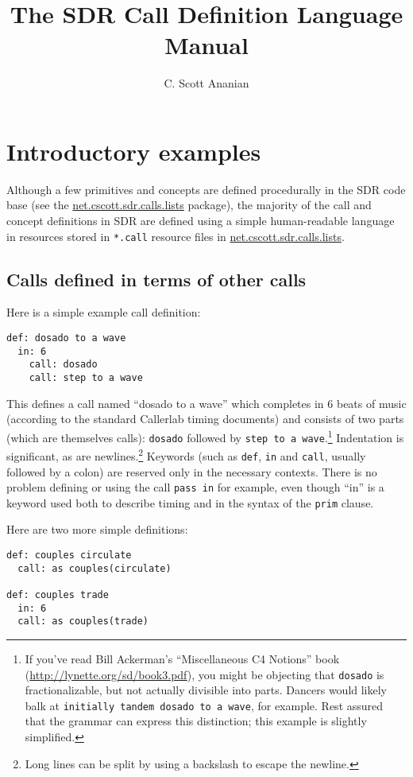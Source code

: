 \documentclass[12pt]{article}
\title{The SDR Call Definition Language Manual}
\author{C. Scott Ananian}
\date{}
\newcommand{\clause}[1]{\texttt{#1}}
\renewcommand{\call}[1]{\texttt{#1}} %
\newcommand{\package}[1]{\url{#1}}
\begin{document}
\maketitle

\section{Introductory examples}

Although a few primitives and concepts are defined procedurally in the
SDR code base (see the \package{net.cscott.sdr.calls.lists}
package), the majority of the call and concept definitions in SDR are
defined using a simple human-readable language in resources stored
in \texttt{*.call} resource files in \package{net.cscott.sdr.calls.lists}.

\subsection{Calls defined in terms of other calls}
Here is a simple example call definition:
\begin{lstlisting}
def: dosado to a wave
  in: 6
    call: dosado
    call: step to a wave
\end{lstlisting}

This defines a call named ``dosado to a wave'' which completes in 6
beats of music (according to the standard Callerlab timing documents)
and consists of two parts (which are themselves calls): \call{dosado}
followed by \call{step to a wave}.\footnote{If you've read Bill
  Ackerman's ``Miscellaneous C4 Notions'' book
  (\url{http://lynette.org/sd/book3.pdf}), you might be objecting that
  \call{dosado} is fractionalizable, but not actually divisible into
  parts.  Dancers would likely balk at \call{initially tandem dosado
    to a wave}, for example.  Rest assured that the grammar can
  express this distinction; this example is slightly simplified.}
Indentation is significant, as are newlines.\footnote{Long lines can
  be split by using a backslash to escape the newline.}
Keywords (such as \clause{def}, \clause{in} and \clause{call}, usually
followed by a colon) are reserved only in the necessary contexts.
There is no problem defining or using the call
\call{pass in} for example, even though ``in'' is a keyword used both
to describe timing and in the syntax of the \clause{prim}  clause.

Here are two more simple definitions:
\begin{lstlisting}
def: couples circulate
  call: as couples(circulate)

def: couples trade
  in: 6
  call: as couples(trade)
\end{lstlisting}
\end{document}
